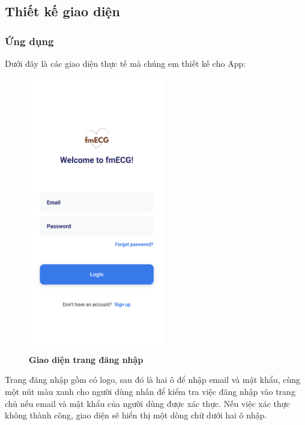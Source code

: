 


\subsection{Thiết kế giao diện}

\subsubsection{Ứng dụng}

Dưới đây là các giao diện thực tế mà chúng em thiết kế cho App:
\begin{figure}[H]
  \centering
  \includegraphics[width=6cm,height=12cm]{Images/mobile_app/demo/login.png}
  \caption[Giao diện trang đăng nhập]{\bfseries \fontsize{12pt}{0pt}\selectfont Giao diện trang đăng nhập}
  \label{demo_login} %
\end{figure}

Trang đăng nhập gồm có logo, sau đó là hai ô để nhập email và mật khẩu, cùng một nút màu xanh cho người dùng nhấn để kiểm tra 
việc đăng nhập vào
trang chủ nếu email và mật khẩu của người dùng được xác thực. Nếu việc xác thực không thành công, giao diện sẽ hiển thị
một dòng chữ dưới hai ô nhập.


